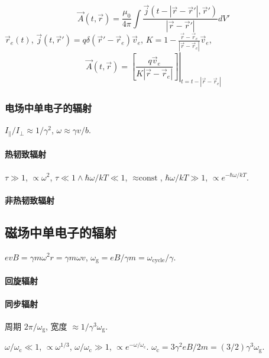 \begin{equation}
    \vec{A}(t,\vec{r})=\frac{\mu_0}{4\pi}\int\frac{\vec{j}(t-|\vec{r}-\vec{r}'|,\vec{r}')}{|\vec{r}-\vec{r}'|}dV'
\end{equation}
$\vec{r}_e(t)$, $\vec{j}(t,\vec{r}')=q\delta(\vec{r}'-\vec{r}_e)\vec{v}_e$, $K=1-\frac{\vec{r}-\vec{r}_e}{|\vec{r}-\vec{r}_e|}\vec{v}_e$,
\begin{equation}
    \vec{A}(t,\vec{r})=\left.\left[\frac{q\vec{v}_e}{K|\vec{r}-\vec{r}_e|}\right]\right|_{t=t-|\vec{r}-\vec{r}_e|}
\end{equation}

\subsubsection{电场中单电子的辐射}

$I_\parallel/I_\perp\approx 1/\gamma^2$, $\omega\approx\gamma v/b$.

\paragraph{热韧致辐射}

$\tau\gg 1$, $\propto\omega^2$, $\tau\ll 1 \wedge \hbar\omega/kT\ll 1$, $\approx\text{const}$, $\hbar\omega/kT\gg 1$, $\propto e^{-\hbar\omega/kT}$.

\paragraph{非热韧致辐射}

\subsection{磁场中单电子的辐射}

$evB=\gamma m \omega^2 r=\gamma m \omega v$, $\omega_\text{g}=eB/\gamma m=\omega_\text{cycle}/\gamma$.

\paragraph{回旋辐射}

\paragraph{同步辐射}

周期 $2\pi/\omega_\text{g}$, 宽度 $\approx1/\gamma^3\omega_\text{g}$.

$\omega/\omega_\text{c}\ll 1$, $\propto\omega^{1/3}$, $\omega/\omega_\text{c}\gg 1$, $\propto e^{-\omega/\omega_\text{c}}$. $\omega_\text{c}=3\gamma^2eB/2m=(3/2)\gamma^3\omega_\text{g}$.

